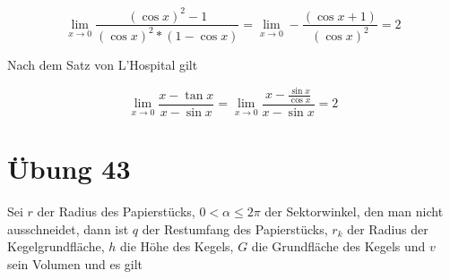 \documentclass[a4paper,10pt]{article}
\begin{document}
\begin{equation}
 \lim_{x \rightarrow 0} \frac{(\cos x)^2 - 1}{(\cos x)^2 * (1 - \cos x)} = \lim_{x \rightarrow 0} -\frac{(\cos x + 1)}{(\cos x)^2} = 2
\end{equation}

Nach dem Satz von L'Hospital gilt

\begin{equation}
 \lim_{x \rightarrow 0} \frac{x - \tan x}{x - \sin x} = \lim_{x \rightarrow 0} \frac{x - \frac{\sin x}{\cos x}}{x - \sin x} = 2
\end{equation}

\section*{Übung 43}

Sei $r$ der Radius des Papierstücks, $0 < \alpha \le 2 \pi$ der Sektorwinkel, den man nicht ausschneidet, dann ist $q$ der Restumfang des Papierstücks, $r_k$ der Radius der Kegelgrundfläche, $h$ die Höhe des Kegels, $G$ die Grundfläche des Kegels und $v$ sein Volumen und es gilt
\end{document}
